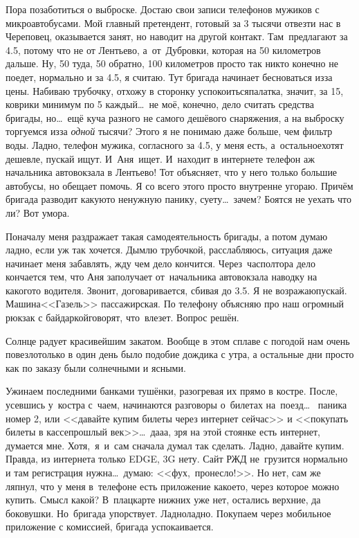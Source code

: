 Пора позаботиться о выброске. Достаю свои записи телефонов мужиков с микроавтобусами. Мой главный претендент, готовый за 3 тысячи отвезти нас в Череповец, оказывается занят, но наводит на другой контакт. Там~предлагают за 4.5, потому что не от Лентьево, а~от~Дубровки, которая на 50 километров дальше. Ну, 50 туда, 50 обратно, 100 километров просто так никто конечно не поедет, нормально и за 4.5, я считаю. Тут бригада начинает бесноваться из\sdash за цены. Набиваю трубочку, отхожу в сторонку успокоиться\mdash палатка, значит, за 15, коврики минимум по 5 каждый\ldots~не моё, конечно, дело считать средства бригады, но\ldots~ещё куча разного не самого дешёвого снаряжения, а на выброску торгуемся из\sdash за \textit{одной} тысячи? Этого я не понимаю даже больше, чем фильтр воды. Ладно, телефон  мужика, согласного за 4.5, у  меня есть, а~остальное\mdash хотят дешевле, пускай ищут. И~Аня~ищет. И~находит в интернете телефон аж начальника автовокзала в Лентьево! Тот объясняет, что у него только большие автобусы, но обещает помочь. Я со всего этого просто внутренне угораю. Причём бригада разводит какую\sdash то ненужную панику, суету\ldots~зачем? Боятся не уехать что ли? Вот умора.

Поначалу меня раздражает такая самодеятельность бригады, а потом думаю ладно, если уж так хочется. Дымлю трубочкой, расслабляюсь, ситуация даже начинает меня забавлять, жду чем дело кончится. Через~час\sdash полтора дело кончается тем, что Аня заполучает от~начальника автовокзала наводку на какого\sdash то водителя. Звонит, договаривается, сбивая до 3.5. Я не возражаю\mdash пускай. Машина\mdash <<Газель>> пассажирская. По телефону объясняю про наш огромный рюкзак с байдаркой\mdash говорят, что~влезет. Вопрос решён.

Солнце радует красивейшим закатом. Вообще в этом сплаве с погодой нам очень повезло\mdash только в один день было подобие дождика с утра, а остальные дни просто как по заказу были солнечными и ясными.

Ужинаем последними банками тушёнки, разогревая их прямо в костре. После, усевшись у~костра с~чаем, начинаются разговоры о~билетах на~поезд\ldots~ паника номер 2, или <<давайте купим билеты через интернет сейчас>> и <<покупать билеты в кассе\mdash прошлый век>>\ldots~да\sdash а\sdash а, зря на этой стоянке есть интернет, думается мне. Хотя,~я~и~сам сначала думал так сделать. Ладно, давайте купим. Правда, из интернета только EDGE, 3G нету. Сайт РЖД не~грузится нормально и там регистрация нужна\ldots~думаю: <<фух,~пронесло!>>. Но нет, сам же ляпнул, что у меня в~телефоне есть приложение какое\sdash то, через которое можно купить. Смысл какой? В~плацкарте нижних уже нет, остались верхние, да боковушки. Но~бригада упорствует. Ладно\sdash ладно. Покупаем через мобильное приложение с комиссией, бригада успокаивается. 

